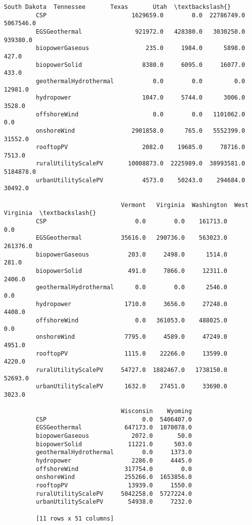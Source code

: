 \documentclass[11pt]{article}
\begin{document}
\begin{Verbatim}[commandchars=\\\{\}]
                                 South Dakota  Tennessee       Texas       Utah  \textbackslash{}
         CSP                        1629659.0        0.0  22786749.0  5067546.0   
         EGSGeothermal               921972.0   428380.0   3030250.0   939380.0   
         biopowerGaseous                235.0     1984.0      5898.0      427.0   
         biopowerSolid                 8380.0     6095.0     16077.0      433.0   
         geothermalHydrothermal           0.0        0.0         0.0    12981.0   
         hydropower                    1047.0     5744.0      3006.0     3528.0   
         offshoreWind                     0.0        0.0   1101062.0        0.0   
         onshoreWind                2901858.0      765.0   5552399.0    31552.0   
         rooftopPV                     2082.0    19685.0     78716.0     7513.0   
         ruralUtilityScalePV       10008873.0  2225989.0  38993581.0  5184878.0   
         urbanUtilityScalePV           4573.0    50243.0    294684.0    30492.0   
         
                                 Vermont   Virginia  Washington  West Virginia  \textbackslash{}
         CSP                         0.0        0.0    161713.0            0.0   
         EGSGeothermal           35616.0   290736.0    563023.0       261376.0   
         biopowerGaseous           203.0     2498.0      1514.0          281.0   
         biopowerSolid             491.0     7866.0     12311.0         2406.0   
         geothermalHydrothermal      0.0        0.0      2546.0            0.0   
         hydropower               1710.0     3656.0     27248.0         4408.0   
         offshoreWind                0.0   361053.0    488025.0            0.0   
         onshoreWind              7795.0     4589.0     47249.0         4951.0   
         rooftopPV                1115.0    22266.0     13599.0         4220.0   
         ruralUtilityScalePV     54727.0  1882467.0   1738150.0        52693.0   
         urbanUtilityScalePV      1632.0    27451.0     33690.0         3023.0   
         
                                 Wisconsin    Wyoming  
         CSP                           0.0  5406407.0  
         EGSGeothermal            647173.0  1070078.0  
         biopowerGaseous            2072.0       50.0  
         biopowerSolid             11221.0      503.0  
         geothermalHydrothermal        0.0     1373.0  
         hydropower                 2286.0     4445.0  
         offshoreWind             317754.0        0.0  
         onshoreWind              255266.0  1653856.0  
         rooftopPV                 13939.0     1550.0  
         ruralUtilityScalePV     5042258.0  5727224.0  
         urbanUtilityScalePV       54938.0     7232.0  
         
         [11 rows x 51 columns]
\end{Verbatim}
            
\end{document}
